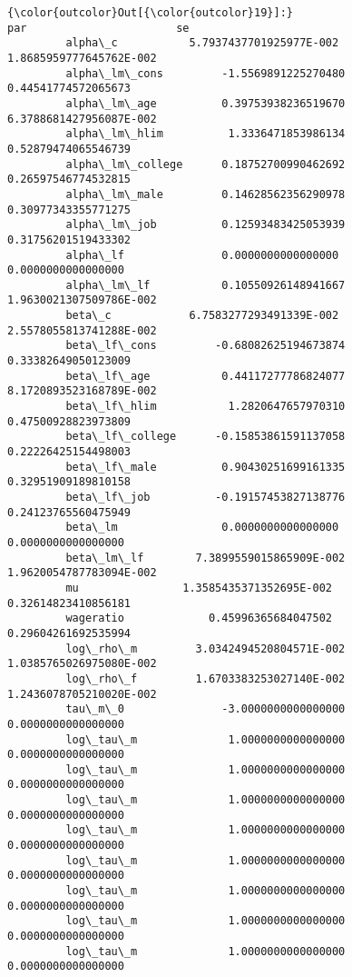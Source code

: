 \documentclass[11pt]{article}
\begin{document}
\begin{Verbatim}[commandchars=\\\{\}]
{\color{outcolor}Out[{\color{outcolor}19}]:}                                       par                       se
         alpha\_c           5.7937437701925977E-002  1.8685959777645762E-002
         alpha\_lm\_cons         -1.5569891225270480      0.44541774572065673
         alpha\_lm\_age          0.39753938236519670  6.3788681427956087E-002
         alpha\_lm\_hlim          1.3336471853986134      0.52879474065546739
         alpha\_lm\_college      0.18752700990462692      0.26597546774532815
         alpha\_lm\_male         0.14628562356290978      0.30977343355771275
         alpha\_lm\_job          0.12593483425053939      0.31756201519433302
         alpha\_lf               0.0000000000000000       0.0000000000000000
         alpha\_lm\_lf           0.10550926148941667  1.9630021307509786E-002
         beta\_c            6.7583277293491339E-002  2.5578055813741288E-002
         beta\_lf\_cons         -0.68082625194673874      0.33382649050123009
         beta\_lf\_age           0.44117277786824077  8.1720893523168789E-002
         beta\_lf\_hlim           1.2820647657970310      0.47500928823973809
         beta\_lf\_college      -0.15853861591137058      0.22226425154498003
         beta\_lf\_male          0.90430251699161335      0.32951909189810158
         beta\_lf\_job          -0.19157453827138776      0.24123765560475949
         beta\_lm                0.0000000000000000       0.0000000000000000
         beta\_lm\_lf        7.3899559015865909E-002  1.9620054787783094E-002
         mu                1.3585435371352695E-002      0.32614823410856181
         wageratio             0.45996365684047502      0.29604261692535994
         log\_rho\_m         3.0342494520804571E-002  1.0385765026975080E-002
         log\_rho\_f         1.6703383253027140E-002  1.2436078705210020E-002
         tau\_m\_0               -3.0000000000000000       0.0000000000000000
         log\_tau\_m              1.0000000000000000       0.0000000000000000
         log\_tau\_m              1.0000000000000000       0.0000000000000000
         log\_tau\_m              1.0000000000000000       0.0000000000000000
         log\_tau\_m              1.0000000000000000       0.0000000000000000
         log\_tau\_m              1.0000000000000000       0.0000000000000000
         log\_tau\_m              1.0000000000000000       0.0000000000000000
         log\_tau\_m              1.0000000000000000       0.0000000000000000
         log\_tau\_m              1.0000000000000000       0.0000000000000000

\end{Verbatim}
\end{document}
